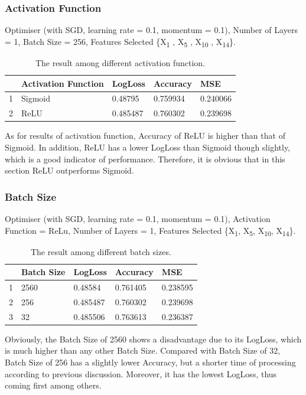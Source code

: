 \documentclass[
10pt, %
a4paper, %
oneside, %
headinclude,footinclude, %
BCOR5mm, %
]{scrartcl}
\begin{document}
\subsubsection{Activation Function}
Optimiser (with SGD, learning rate = 0.1, momentum = 0.1), Number of Layers = 1, Batch Size = 256, Features Selected \{X\textsubscript{1} , X\textsubscript{5} , X\textsubscript{10} , X\textsubscript{14}\}.
\begin{table}[H]
\centering
\caption{The result among different activation function.}
\label{my-label}
\begin{tabular}{|l|l|l|l|l|}
\hline
\textbf{} & \textbf{Activation Function} & \textbf{LogLoss} & \textbf{Accuracy} & \textbf{MSE} \\ \hline
1 & Sigmoid & 0.48795 & 0.759934 & 0.240066 \\ \hline
2 & ReLU & 0.485487 & 0.760302 & 0.239698 \\ \hline
\end{tabular}
\end{table}
As for results of activation function, Accuracy of ReLU is higher than that of Sigmoid. In addition, ReLU has a lower LogLoss than Sigmoid though slightly, which is a good indicator of performance. Therefore, it is obvious that in this section ReLU outperforms Sigmoid.

\subsubsection{Batch Size}
Optimiser (with SGD, learning rate = 0.1, momentum = 0.1), Activation Function = ReLu, Number of Layers = 1, Features Selected \{X\textsubscript{1}, X\textsubscript{5}, X\textsubscript{10}, X\textsubscript{14}\}.
\begin{table}[H]
\centering
\caption{The result among different batch sizes.}
\label{my-label}
\begin{tabular}{|l|l|l|l|l|}
\hline
\textbf{} & \textbf{Batch Size} & \textbf{LogLoss} & \textbf{Accuracy} & \textbf{MSE} \\ \hline
1 & 2560 & 0.48584 & 0.761405 & 0.238595 \\ \hline
2 & 256 & 0.485487 & 0.760302 & 0.239698 \\ \hline
3 & 32 & 0.485506 & 0.763613 & 0.236387 \\ \hline
\end{tabular}
\end{table}
Obviously, the Batch Size of 2560 shows a disadvantage due to its LogLoss, which is much higher than any other Batch Size. Compared with Batch Size of 32, Batch Size of 256 has a slightly lower Accuracy, but a shorter time of processing according to previous discussion. Moreover, it has the lowest LogLoss, thus coming first among others.
\end{document}
